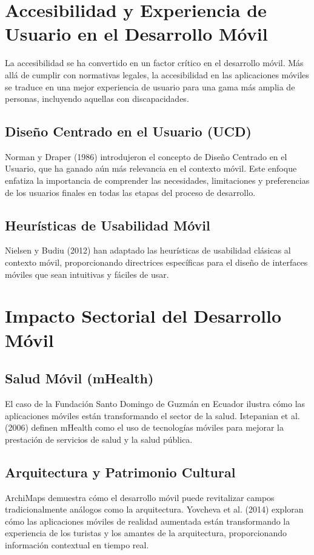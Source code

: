 \documentclass[12pt]{article}
\begin{document}
\section*{Accesibilidad y Experiencia de Usuario en el Desarrollo Móvil}

La accesibilidad se ha convertido en un factor crítico en el desarrollo móvil. Más allá de cumplir con normativas legales, la accesibilidad en las aplicaciones móviles se traduce en una mejor experiencia de usuario para una gama más amplia de personas, incluyendo aquellas con discapacidades.

\subsection*{Diseño Centrado en el Usuario (UCD)}
Norman y Draper (1986) introdujeron el concepto de Diseño Centrado en el Usuario, que ha ganado aún más relevancia en el contexto móvil. Este enfoque enfatiza la importancia de comprender las necesidades, limitaciones y preferencias de los usuarios finales en todas las etapas del proceso de desarrollo.

\subsection*{Heurísticas de Usabilidad Móvil}
Nielsen y Budiu (2012) han adaptado las heurísticas de usabilidad clásicas al contexto móvil, proporcionando directrices específicas para el diseño de interfaces móviles que sean intuitivas y fáciles de usar.

\section*{Impacto Sectorial del Desarrollo Móvil}

\subsection*{Salud Móvil (mHealth)}
El caso de la Fundación Santo Domingo de Guzmán en Ecuador ilustra cómo las aplicaciones móviles están transformando el sector de la salud. Istepanian et al. (2006) definen mHealth como el uso de tecnologías móviles para mejorar la prestación de servicios de salud y la salud pública.

\subsection*{Arquitectura y Patrimonio Cultural}
ArchiMaps demuestra cómo el desarrollo móvil puede revitalizar campos tradicionalmente análogos como la arquitectura. Yovcheva et al. (2014) exploran cómo las aplicaciones móviles de realidad aumentada están transformando la experiencia de los turistas y los amantes de la arquitectura, proporcionando información contextual en tiempo real.
\end{document}
